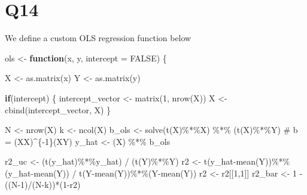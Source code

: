 \documentclass[
  letterpaper,
  DIV=11,
  numbers=noendperiod]{scrartcl}
\newenvironment{Shaded}{\begin{snugshade}}{\end{snugshade}}
\newcommand{\AttributeTok}[1]{\textcolor[rgb]{0.40,0.45,0.13}{#1}}
\newcommand{\CommentTok}[1]{\textcolor[rgb]{0.37,0.37,0.37}{#1}}
\newcommand{\ConstantTok}[1]{\textcolor[rgb]{0.56,0.35,0.01}{#1}}
\newcommand{\ControlFlowTok}[1]{\textcolor[rgb]{0.00,0.23,0.31}{\textbf{#1}}}
\newcommand{\DecValTok}[1]{\textcolor[rgb]{0.68,0.00,0.00}{#1}}
\newcommand{\FunctionTok}[1]{\textcolor[rgb]{0.28,0.35,0.67}{#1}}
\newcommand{\NormalTok}[1]{\textcolor[rgb]{0.00,0.23,0.31}{#1}}
\newcommand{\OtherTok}[1]{\textcolor[rgb]{0.00,0.23,0.31}{#1}}
\newcommand{\SpecialCharTok}[1]{\textcolor[rgb]{0.37,0.37,0.37}{#1}}
\begin{document}
\section{Q14}\label{q14}

We define a custom OLS regression function below

\begin{Shaded}
\begin{Highlighting}[]
\NormalTok{ols }\OtherTok{\textless{}{-}} \ControlFlowTok{function}\NormalTok{(x, y, }\AttributeTok{intercept =} \ConstantTok{FALSE}\NormalTok{) \{}
  
\NormalTok{  X }\OtherTok{\textless{}{-}} \FunctionTok{as.matrix}\NormalTok{(x)}
\NormalTok{  Y }\OtherTok{\textless{}{-}} \FunctionTok{as.matrix}\NormalTok{(y)}

  \ControlFlowTok{if}\NormalTok{(intercept) \{}
\NormalTok{    intercept\_vector }\OtherTok{\textless{}{-}} \FunctionTok{matrix}\NormalTok{(}\DecValTok{1}\NormalTok{, }\FunctionTok{nrow}\NormalTok{(X))}
\NormalTok{    X }\OtherTok{\textless{}{-}} \FunctionTok{cbind}\NormalTok{(intercept\_vector, X)}
\NormalTok{  \}}


\NormalTok{  N }\OtherTok{\textless{}{-}} \FunctionTok{nrow}\NormalTok{(X)}
\NormalTok{  k }\OtherTok{\textless{}{-}} \FunctionTok{ncol}\NormalTok{(X)}
\NormalTok{  b\_ols }\OtherTok{\textless{}{-}} \FunctionTok{solve}\NormalTok{(}\FunctionTok{t}\NormalTok{(X)}\SpecialCharTok{\%*\%}\NormalTok{X) }\SpecialCharTok{\%*\%}\NormalTok{ (}\FunctionTok{t}\NormalTok{(X)}\SpecialCharTok{\%*\%}\NormalTok{Y) }\CommentTok{\# b = (X\textquotesingle{}X)\^{}\{{-}1\}(X\textquotesingle{}Y)}
\NormalTok{  y\_hat }\OtherTok{\textless{}{-}}\NormalTok{ (X) }\SpecialCharTok{\%*\%}\NormalTok{ b\_ols}
  
\NormalTok{  r2\_uc }\OtherTok{\textless{}{-}}\NormalTok{ (}\FunctionTok{t}\NormalTok{(y\_hat)}\SpecialCharTok{\%*\%}\NormalTok{y\_hat) }\SpecialCharTok{/}\NormalTok{ (}\FunctionTok{t}\NormalTok{(Y)}\SpecialCharTok{\%*\%}\NormalTok{Y)}
\NormalTok{  r2 }\OtherTok{\textless{}{-}} \FunctionTok{t}\NormalTok{(y\_hat}\SpecialCharTok{{-}}\FunctionTok{mean}\NormalTok{(Y))}\SpecialCharTok{\%*\%}\NormalTok{(y\_hat}\SpecialCharTok{{-}}\FunctionTok{mean}\NormalTok{(Y)) }\SpecialCharTok{/} \FunctionTok{t}\NormalTok{(Y}\SpecialCharTok{{-}}\FunctionTok{mean}\NormalTok{(Y))}\SpecialCharTok{\%*\%}\NormalTok{(Y}\SpecialCharTok{{-}}\FunctionTok{mean}\NormalTok{(Y))}
\NormalTok{  r2 }\OtherTok{\textless{}{-}}\NormalTok{ r2[[}\DecValTok{1}\NormalTok{,}\DecValTok{1}\NormalTok{]]}
\NormalTok{  r2\_bar }\OtherTok{\textless{}{-}} \DecValTok{1} \SpecialCharTok{{-}}\NormalTok{ ((N}\DecValTok{{-}1}\NormalTok{)}\SpecialCharTok{/}\NormalTok{(N}\SpecialCharTok{{-}}\NormalTok{k))}\SpecialCharTok{*}\NormalTok{(}\DecValTok{1}\SpecialCharTok{{-}}\NormalTok{r2)}


\end{Highlighting}
\end{Shaded}
\end{document}
